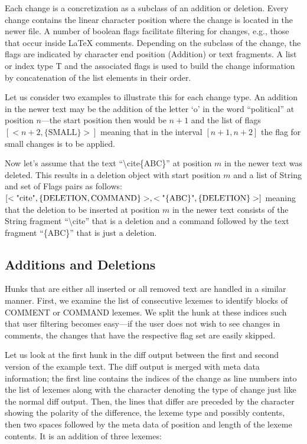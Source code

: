 Each change is a concretization as a subclass of an addition or deletion.  Every change contains the linear character position where the change is located in the newer file.  A number of boolean flags facilitate filtering for changes, e.g., those that occur inside LaTeX comments.  Depending on the subclass of the change, the flags are indicated by character end position (Addition) or text fragments.  A list or index type T and the associated flags is used to build the change information by concatenation of the list elements in their order.

Let us consider two examples to illustrate this for each change type.  An addition in the newer text may be the addition of the letter `o' in the word ``political'' at position $n$---the start position then would be $n+1$ and the list of flags $[<n+2, \{\text{SMALL}\}>]$ meaning that in the interval $[n+1, n+2]$ the flag for small changes is to be applied.

Now let's assume that the text ``\textbackslash cite\{ABC\}'' at position $m$ in the newer text was deleted.  This results in a deletion object with start position $m$ and a list of String and set of Flags pairs as follows: $[<\text{\textquotedbl\\cite\textquotedbl},\{\text{DELETION},\text{COMMAND}\}>,<\text{\textquotedbl\{ABC\}\textquotedbl},\{\text{DELETION}\}>]$ meaning that the deletion to be inserted at position $m$ in the newer text consists of the String fragment ``\textbackslash cite'' that is a deletion and a command followed by the text fragment ``\{ABC\}'' that is just a deletion.

\subsection{Additions and Deletions}

Hunks that are either all inserted or all removed text are handled in a similar manner.  First, we examine the list of consecutive lexemes to identify blocks of COMMENT or COMMAND lexemes.  We split the hunk at these indices such that user filtering becomes easy---if the user does not wish to see changes in comments, the changes that have the respective flag set are easily skipped.

Let us look at the first hunk in the diff output between the first and second version of the example text.  The diff output is merged with meta data information; the first line contains the indices of the change as line numbers into the list of lexemes along with the character denoting the type of change just like the normal diff output.  Then, the lines that differ are preceded by the character showing the polarity of the difference, the lexeme type and possibly contents, then two spaces followed by the meta data of position and length of the lexeme contents.  It is an addition of three lexemes:

